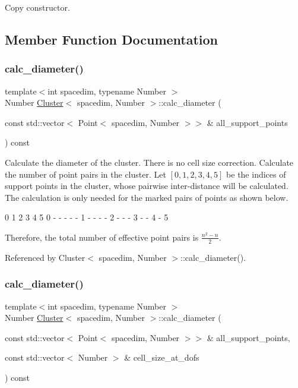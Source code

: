Copy constructor. 

\subsection{Member Function Documentation}
\mbox{\label{classCluster_a2204e6b5cf593d9e93a56f9269d74b4c}} 
\subsubsection{\texorpdfstring{calc\+\_\+diameter()}{calc\_diameter()}\hspace{0.1cm}{\footnotesize\ttfamily [1/2]}}
{\footnotesize\ttfamily template$<$int spacedim, typename Number $>$ \\
Number \hyperlink{classCluster}{Cluster}$<$ spacedim, Number $>$\+::calc\+\_\+diameter (\begin{DoxyParamCaption}\item[{const std\+::vector$<$ Point$<$ spacedim, Number $>$$>$ \&}]{all\+\_\+support\+\_\+points }\end{DoxyParamCaption}) const}

Calculate the diameter of the cluster. There is no cell size correction. Calculate the number of point pairs in the cluster. Let $[0, 1, 2, 3, 4, 5]$ be the indices of support points in the cluster, whose pairwise inter-\/distance will be calculated. The calculation is only needed for the marked pairs of points as shown below.


\begin{DoxyCode}
  0 1 2 3 4 5
0   - - - - -
1     - - - -
2       - - -
3         - -
4           -
5
\end{DoxyCode}


Therefore, the total number of effective point pairs is $\frac{n^2 - n}{2}$.

Referenced by Cluster$<$ spacedim, Number $>$\+::calc\+\_\+diameter().

\mbox{\label{classCluster_ab9900a870bdd05d4638b820716e03293}} 
\subsubsection{\texorpdfstring{calc\+\_\+diameter()}{calc\_diameter()}\hspace{0.1cm}{\footnotesize\ttfamily [2/2]}}
{\footnotesize\ttfamily template$<$int spacedim, typename Number $>$ \\
Number \hyperlink{classCluster}{Cluster}$<$ spacedim, Number $>$\+::calc\+\_\+diameter (\begin{DoxyParamCaption}\item[{const std\+::vector$<$ Point$<$ spacedim, Number $>$$>$ \&}]{all\+\_\+support\+\_\+points,  }\item[{const std\+::vector$<$ Number $>$ \&}]{cell\+\_\+size\+\_\+at\+\_\+dofs }\end{DoxyParamCaption}) const}

